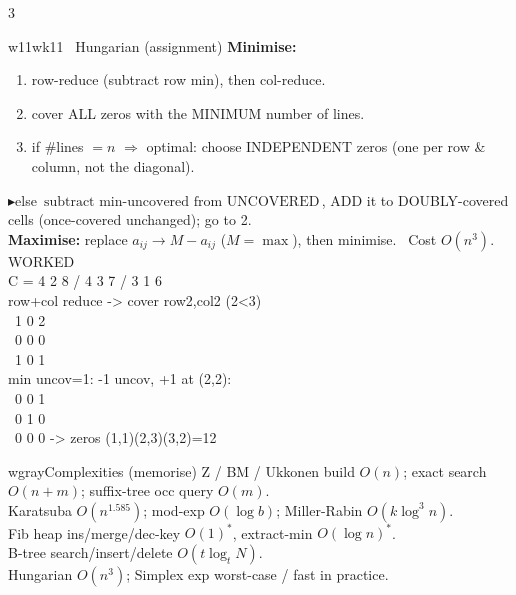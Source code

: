 \documentclass[9pt]{extarticle}
\newcommand{\To}{\ensuremath{\Rightarrow}}
\newcommand{\key}[1]{\colorbox{hl}{\ensuremath{\,#1\,}}}     %
\newcommand{\R}{\textcolor{red!75!black}{$\blacktriangleright$}\;}  %
\newcommand{\ex}{\textcolor{black!55}{\scriptsize\textsf{WORKED}}\\[1pt]} %
\begin{document}
\begin{multicols}{3}
\begin{wk}{w11}{wk11 \ Hungarian (assignment)}
\textbf{Minimise:}
\begin{enumerate}
\item row-reduce (subtract row min), then col-reduce.
\item cover ALL zeros with the MINIMUM number of lines.
\item if \#lines $=n$ \To{} optimal: choose INDEPENDENT zeros (one per row \& column, not the diagonal).
\end{enumerate}
\R else \key{\text{subtract min-uncovered from UNCOVERED}}, ADD it to DOUBLY-covered cells (once-covered unchanged); go to 2.\\[1pt]
\textbf{Maximise:} replace $a_{ij}\to M-a_{ij}$ ($M{=}\max$), then minimise. \ Cost $O(n^3)$.
\tcblower
\ex
\ttfamily
C = 4 2 8 / 4 3 7 / 3 1 6\\
row+col reduce -> cover row2,col2 (2<3)\\
\ 1 0 2\\
\ 0 0 0\\
\ 1 0 1\\
min uncov=1: -1 uncov, +1 at (2,2):\\
\ 0 0 1\\
\ 0 1 0\\
\ 0 0 0  -> zeros (1,1)(2,3)(3,2)=12
\end{wk}

\begin{wk}{wgray}{Complexities (memorise)}
Z / BM / Ukkonen build $O(n)$; exact search $O(n{+}m)$; suffix-tree occ query $O(m)$.\\
Karatsuba $O(n^{1.585})$; mod-exp $O(\log b)$; Miller-Rabin $O(k\log^3 n)$.\\
Fib heap ins/merge/dec-key $O(1)^*$, extract-min $O(\log n)^*$.\\
B-tree search/insert/delete $O(t\log_t N)$.\\
Hungarian $O(n^3)$; Simplex exp worst-case / fast in practice.
\end{wk}

\end{multicols}
\end{document}
